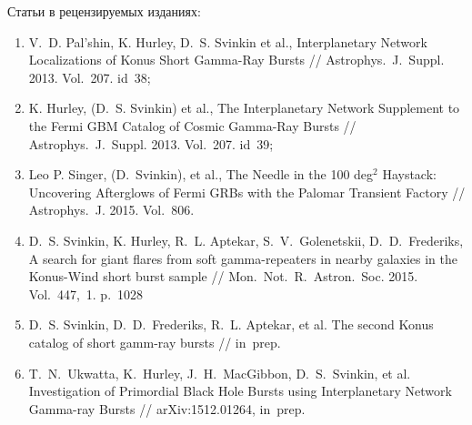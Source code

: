 Статьи в рецензируемых изданиях:
\begin{enumerate}
\item V.~D. Pal'shin, K. Hurley, D.~S. Svinkin et al., Interplanetary Network Localizations of
Konus Short Gamma-Ray Bursts // Astrophys.~J.~Suppl. 2013. Vol.~207. id~38;
\item K. Hurley, (D.~S. Svinkin) et al., The Interplanetary Network Supplement to 
the Fermi GBM Catalog of Cosmic Gamma-Ray Bursts // Astrophys.~J.~Suppl. 2013. Vol.~207. id~39;
\item Leo P. Singer, (D.~Svinkin), et al., The Needle in the 100 deg$^2$ Haystack: 
Uncovering Afterglows of Fermi GRBs with the Palomar Transient Factory // 
Astrophys.~J. 2015. Vol.~806.
\item D.~S. Svinkin, K. Hurley, R.~L. Aptekar, S.~V.~Golenetskii, D.~D.~Frederiks, 
A search for giant flares from soft gamma-repeaters in nearby galaxies in the 
Konus-Wind short burst sample // Mon.~Not.~R.~Astron.~Soc. 2015. Vol.~447,~1. p.~1028
\item D.~S. Svinkin, D.~D.~Frederiks, R.~L. Aptekar, et al.
The second Konus catalog of short gamm-ray bursts // in~prep.
\item T.~N.~Ukwatta, K.~Hurley, J.~H.~MacGibbon, D.~S.~Svinkin, et al.
Investigation of Primordial Black Hole Bursts using Interplanetary Network Gamma-ray Bursts // 
arXiv:1512.01264, in~prep.

\end{enumerate}


